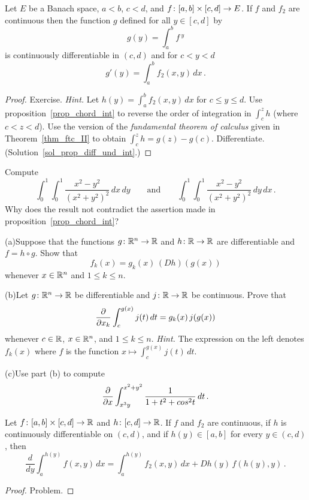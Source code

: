 \begin{prop}\label{prop_diff_und_int}  Let $E$ be a Banach space, $a < b$, $c < d$, and $f \colon
[a,b]\times [c,d] \rightarrow E$.  If $f$ and $f_2$ are continuous then the function $g$ defined for
all $y \in [c,d]$ by
  \[ g(y) = \int_a^b f\,^y \]
is continuously differentiable in $(c,d)$ and for $c < y < d$
  \[ g'(y) = \int_a^b f_2(x,y)\,dx\,. \]
\end{prop}

\begin{proof} Exercise.    \emph{Hint.}  Let $h(y) = \int_a^b f_2(x,y)\,dx$ for $c \le y \le d$.
Use proposition~\ref{prop_chord_int} to reverse the order of integration in $\int_c^z h$
(where $c < z < d$).  Use the version of the \emph{fundamental theorem of calculus} given in
Theorem~\ref{thm_ftc_II} to obtain $\int_c^z h = g(z) - g(c)$. Differentiate.
(Solution~\ref{sol_prop_diff_und_int}.) \ns
\end{proof}


\begin{prob}  Compute
  \[ \int_0^1\int_0^1 \frac {x^2-y^2}{(x^2+y^2)^2}\,dx\,dy  \qquad \text{and} \qquad
                                \int_0^1\int_0^1 \frac {x^2-y^2}{(x^2+y^2)^2}\,dy\,dx\,. \]
Why does the result not contradict the assertion made in proposition~\ref{prop_chord_int}?
\end{prob}

\begin{prob} (a)\quad Suppose that the functions $g\colon \mathbb{R}^n \rightarrow \mathbb{R}$ and $h \colon \mathbb{R} \rightarrow \mathbb{R}$
are differentiable and $f = h \circ g$.  Show that
  \[ f_k(x) = g_k(x)\,(Dh)(g(x)) \]
whenever $x \in \mathbb{R}^n$ and $1 \le k \le n$.

(b)\quad Let $g \colon \mathbb{R}^n \rightarrow \mathbb{R}$ be differentiable and $j \colon \mathbb{R} \rightarrow \mathbb{R}$ be
continuous. Prove that
  \[ \frac{\partial}{\partial x_k}\int_c^{g(x)}j(t)\,dt = g_k(x)\,j(g(x)) \]
whenever $c \in \mathbb{R}$, $x \in \mathbb{R}^n$, and $1 \le k \le n$. \emph{Hint.}  The expression on the
left denotes $f_k(x)$ where $f$ is the function $x \mapsto \int_c^{g(x)}j(t)\,dt$.

(c)\quad  Use part (b) to compute
  \[ \frac{\partial}{\partial x}\int_{x^3y}^{x^2 + y^2}\frac 1{1 + t^2 + cos^2t}\,dt\,. \]
\end{prob}

\begin{prop}  Let $f\colon [a,b] \times [c,d] \rightarrow \mathbb{R}$ and $h \colon [c,d]
\rightarrow \mathbb{R}$.  If $f$ and $f_2$ are continuous, if $h$ is continuously differentiable on $(c,d)$,
and if $h(y) \in [a,b]$ for every $y \in (c,d)$, then
  \[ \frac d{dy}\int_a^{h(y)}f(x,y)\,dx = \int_a^{h(y)}f_2(x,y)\,dx + Dh(y)\,f(h(y),y)\,. \]
\end{prop}

\begin{proof} Problem.  \ns  \end{proof}
